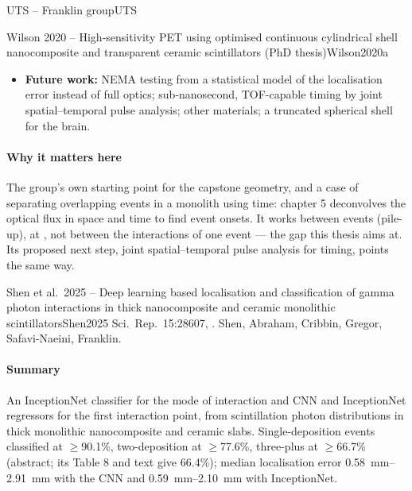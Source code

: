 \begin{programnote}{UTS -- Franklin group}{UTS}
\begin{papernote}{Wilson 2020 -- High-sensitivity PET using optimised continuous cylindrical shell nanocomposite and transparent ceramic scintillators (PhD thesis)}{Wilson2020a}
\begin{itemize}
		\qty{3}{\second} of simulated data, since full optical tracking is
		so costly.
	\item \textbf{Future work:} NEMA testing from a statistical model of the
		localisation error instead of full optics; sub-nanosecond, TOF-capable
		timing by joint spatial--temporal pulse analysis; other materials;
		a truncated spherical shell for the brain.
\end{itemize}

\paragraph{Why it matters here}
The group's own starting point for the capstone geometry, and a case of
separating overlapping events in a monolith using time: chapter 5
deconvolves the optical flux in space and time to find event onsets. It works
between events (pile-up), at , not between the interactions of one
event --- the gap this thesis aims at. Its proposed next step, joint
spatial--temporal pulse analysis for timing, points the same way.

\end{papernote}

\begin{papernote}{Shen et al.\ 2025 -- Deep learning based localisation and classification of gamma photon interactions in thick nanocomposite and ceramic monolithic scintillators}{Shen2025}
Sci.\ Rep.\ 15:28607, . Shen, Abraham,
Cribbin, Gregor, Safavi-Naeini, Franklin.

\paragraph{Summary}
An InceptionNet classifier for the mode of interaction and CNN and
InceptionNet regressors for the first interaction point, from scintillation
photon distributions in thick monolithic nanocomposite and ceramic slabs.
Single-deposition events classified at $\geq$90.1\%, two-deposition at
$\geq$77.6\%, three-plus at $\geq$66.7\% (abstract; its Table 8 and text give 66.4\%); median localisation error
\qtyrange{0.58}{2.91}{\milli\metre} with the CNN and
\qtyrange{0.59}{2.10}{\milli\metre} with InceptionNet.


\end{papernote}
\end{programnote}
